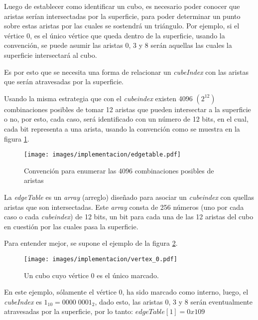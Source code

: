 Luego de establecer como identificar un cubo, es necesario poder conocer que aristas serían intersectadas por la superficie, para poder determinar un punto sobre estas aristas por las cuales se sostendrá un triángulo. Por ejemplo, si el vértice $0$, es el único vértice que queda dentro de la superficie, usando la convención, se puede asumir las aristas $0$, $3$ y $8$ serán aquellas las cuales la superficie intersectará al cubo.

Es por esto que se necesita una forma de relacionar un \emph{cubeIndex} con las aristas que serán atravesadas por la superficie.

Usando la misma estrategia que con el \emph{cubeindex} existen 4096 $(2^{12})$ combinaciones posibles de tomar 12 aristas que pueden intersectar a la superficie o no, por esto, cada caso, será identificado con un número de 12 bits, en el cual, cada bit representa a una arista, usando la convención como se muestra en la figura \ref{f:ch:implementacion:sec:CubeIndex:edgeTable:edge_convention}.

\begin{figure}[hbt]
	\centering
	\fbox
	{
		\texttt{[image: images/implementacion/edgetable.pdf]}
	}
	\caption{Convención para enumerar las 4096 combinaciones posibles de aristas}
	\label{f:ch:implementacion:sec:CubeIndex:edgeTable:edge_convention}
\end{figure}

La \emph{edgeTable} es un \emph{array} (arreglo) diseñado para asociar un \emph{cubeindex} con quellas aristas que son intersectadas. Este \emph{array} consta de 256 números (uno por cada caso o cada \emph{cubeindex}) de 12 bits, un bit para cada una de las 12 aristas del cubo en cuestión por las cuales pasa la superficie.

Para entender mejor, se supone el ejemplo de la figura \ref{f:ch:implementacion:sec:CubeIndex:edgeTable:vertex_0}.

\begin{figure}[hbt]
	\centering
	\fbox
	{
		\texttt{[image: images/implementacion/vertex\_0.pdf]}
	}
	\caption{Un cubo cuyo vértice $0$ es el único marcado.}
	\label{f:ch:implementacion:sec:CubeIndex:edgeTable:vertex_0}
\end{figure}

En este ejemplo, sólamente el vértice $0$, ha sido marcado como interno, luego, el \emph{cubeIndex} es $1_{10} = 0000 \; 0001_{2}$, dado esto, las aristas $0$, $3$ y $8$ serán eventualmente atravesadas por la superficie, por lo tanto: $edgeTable[1] = 0x109$

